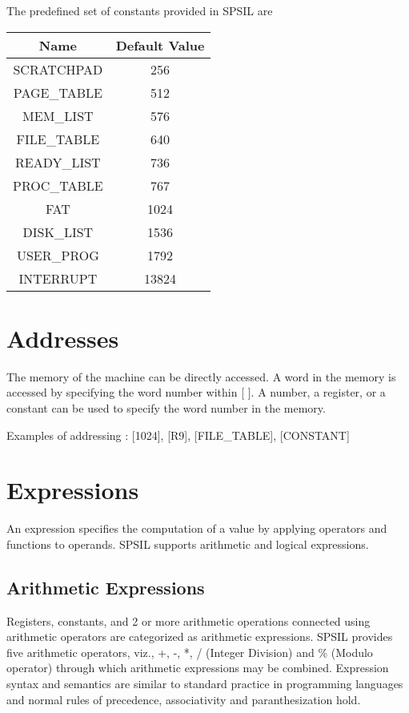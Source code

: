 \documentclass[11pt]{article}
\begin{document}
The predefined set of constants provided in SPSIL are \\

\begin{tabular}{| c | c |}
\hline
\textbf{Name} & \textbf{Default Value} \\
\hline
SCRATCHPAD 	& 	256 \\
\hline
PAGE\_TABLE 	& 	512  \\
\hline
MEM\_LIST 	&	576 	\\
\hline
FILE\_TABLE 	& 	640		\\
\hline
READY\_LIST 	& 	736	\\
\hline
PROC\_TABLE 	& 	767 \\
\hline
FAT 		& 	1024    \\
\hline
DISK\_LIST 	& 	1536 	\\
\hline
USER\_PROG 	& 	1792	\\
\hline
INTERRUPT & 	13824	\\
\hline
\end{tabular}

\section{Addresses}
The memory of the machine can be directly accessed. A word in the memory is accessed by specifying the word number within [ ]. A number, a register, or a constant can be used to specify the word number in the memory.

Examples of addressing : [1024], [R9], [FILE\_TABLE], [CONSTANT]

\section{Expressions}
An expression specifies the computation of a value by applying operators and functions to operands. SPSIL supports arithmetic and logical expressions.

\subsection{Arithmetic Expressions}

Registers, constants, and 2 or more arithmetic operations connected using arithmetic operators are categorized as arithmetic expressions. SPSIL provides five arithmetic operators, viz., +, -, *, / (Integer Division) and \% (Modulo operator) through which arithmetic expressions may be combined. Expression syntax and semantics are similar to standard practice in programming languages and normal rules of precedence, associativity and paranthesization hold. 
\end{document}
